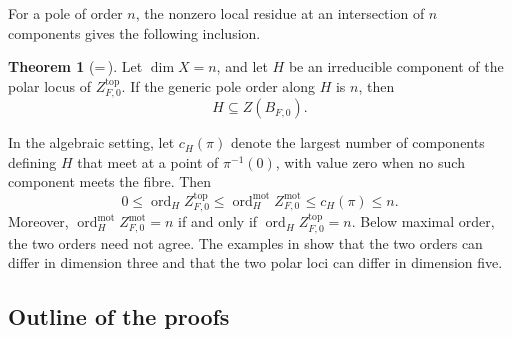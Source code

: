 \documentclass[12pt]{amsart}
\numberwithin{equation}{section}
\theoremstyle{plain}
\theoremstyle{definition}
\theoremstyle{remark}
\theoremstyle{definition}
\newtheorem{maintheorem}{Theorem}
\DeclareMathOperator{\ord}{ord}
\begin{document}
For a pole of order $n$, the nonzero local residue at an intersection of $n$ components gives the following inclusion.

\begin{maintheorem}[{=\,}]\label{thm:maximal-intro}
Let $\dim X=n$, and let $H$ be an irreducible component of the polar locus of $Z^{\mathrm{top}}_{F,0}$. If the generic pole order along $H$ is $n$, then
\[
H\subseteq Z(B_{F,0}).
\]
\end{maintheorem}

In the algebraic setting, let $c_H(\pi)$ denote the largest number of components defining $H$ that meet at a point of $\pi^{-1}(0)$, with value zero when no such component meets the fibre. Then
\begin{equation}\label{eq:higher-motivic-intro}
0\leq\ord_HZ^{\mathrm{top}}_{F,0}\leq\ord_H^{\mathrm{mot}}Z^{\mathrm{mot}}_{F,0}\leq c_H(\pi)\leq n.
\end{equation}
Moreover, $\ord_H^{\mathrm{mot}}Z^{\mathrm{mot}}_{F,0}=n$ if and only if $\ord_HZ^{\mathrm{top}}_{F,0}=n$. Below maximal order, the two orders need not agree. The examples in  show that the two orders can differ in dimension three and that the two polar loci can differ in dimension five.



\subsection{Outline of the proofs}
\end{document}
